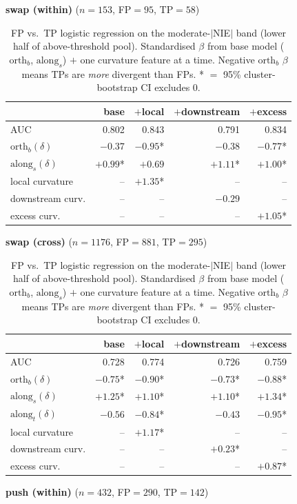 \begin{table}[t]
\centering
\caption{FP vs.\ TP logistic regression on the moderate-$|$NIE$|$ band (lower half of above-threshold pool). Standardised $\beta$ from base model ($\mathrm{orth}_b$, $\mathrm{along}_s$) $+$ one curvature feature at a time. Negative $\mathrm{orth}_b$ $\beta$ means TPs are \emph{more} divergent than FPs. * $=$ 95\% cluster-bootstrap CI excludes 0.}
\label{tab:fptp-curv}
\small

\medskip
\textbf{swap (within)} ($n=153$, FP$=95$, TP$=58$)

\begin{tabular}{l r r r r}
\toprule
 & base & $+$local & $+$downstream & $+$excess \\
\midrule
AUC & 0.802 & 0.843 & 0.791 & 0.834 \\
$\mathrm{orth}_b(\delta)$ & $-0.37$ & $-0.95$* & $-0.38$ & $-0.77$* \\
$\mathrm{along}_s(\delta)$ & $+0.99$* & $+0.69$ & $+1.11$* & $+1.00$* \\
local curvature & -- & $+1.35$* & -- & -- \\
downstream curv. & -- & -- & $-0.29$ & -- \\
excess curv. & -- & -- & -- & $+1.05$* \\
\bottomrule
\end{tabular}

\medskip
\textbf{swap (cross)} ($n=1176$, FP$=881$, TP$=295$)

\begin{tabular}{l r r r r}
\toprule
 & base & $+$local & $+$downstream & $+$excess \\
\midrule
AUC & 0.728 & 0.774 & 0.726 & 0.759 \\
$\mathrm{orth}_b(\delta)$ & $-0.75$* & $-0.90$* & $-0.73$* & $-0.88$* \\
$\mathrm{along}_s(\delta)$ & $+1.25$* & $+1.10$* & $+1.10$* & $+1.34$* \\
$\mathrm{along}_t(\delta)$ & $-0.56$ & $-0.84$* & $-0.43$ & $-0.95$* \\
local curvature & -- & $+1.17$* & -- & -- \\
downstream curv. & -- & -- & $+0.23$* & -- \\
excess curv. & -- & -- & -- & $+0.87$* \\
\bottomrule
\end{tabular}

\medskip
\textbf{push (within)} ($n=432$, FP$=290$, TP$=142$)


\end{table}

